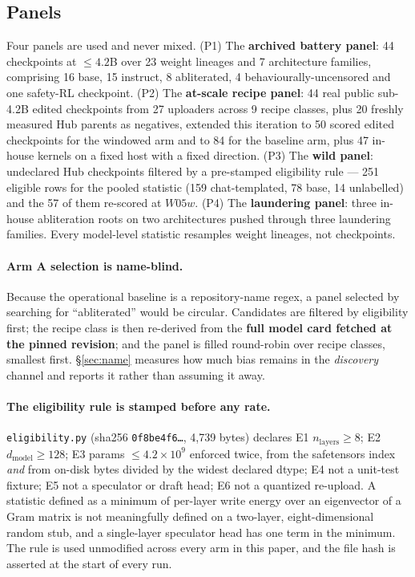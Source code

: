 \documentclass[11pt,letterpaper]{article}
\begin{document}
\subsection{Panels}

Four panels are used and never mixed. (P1) The \textbf{archived battery panel}: 44 checkpoints at $\leq 4.2$B over 23 weight lineages and 7 architecture families, comprising 16 base, 15 instruct, 8 abliterated, 4 behaviourally-uncensored and one safety-RL checkpoint. (P2) The \textbf{at-scale recipe panel}: 44 real public sub-4.2B edited checkpoints from 27 uploaders across 9 recipe classes, plus 20 freshly measured Hub parents as negatives, extended this iteration to 50 scored edited checkpoints for the windowed arm and to 84 for the baseline arm, plus 47 in-house kernels on a fixed host with a fixed direction. (P3) The \textbf{wild panel}: undeclared Hub checkpoints filtered by a pre-stamped eligibility rule --- 251 eligible rows for the pooled statistic (159 chat-templated, 78 base, 14 unlabelled) and the 57 of them re-scored at $W05w$. (P4) The \textbf{laundering panel}: three in-house abliteration roots on two architectures pushed through three laundering families. Every model-level statistic resamples weight lineages, not checkpoints.

\paragraph{Arm A selection is name-blind.} Because the operational baseline is a repository-name regex, a panel selected by searching for ``abliterated'' would be circular. Candidates are filtered by eligibility first; the recipe class is then re-derived from the \textbf{full model card fetched at the pinned revision}; and the panel is filled round-robin over recipe classes, smallest first. \S\ref{sec:name} measures how much bias remains in the \emph{discovery} channel and reports it rather than assuming it away.

\paragraph{The eligibility rule is stamped before any rate.} \texttt{eligibility.py} (sha256 \texttt{0f8be4f6\ldots}, 4,739 bytes) declares E1 $n_{\text{layers}}\geq 8$; E2 $d_{\text{model}}\geq 128$; E3 params $\leq 4.2\times10^9$ enforced twice, from the safetensors index \emph{and} from on-disk bytes divided by the widest declared dtype; E4 not a unit-test fixture; E5 not a speculator or draft head; E6 not a quantized re-upload. A statistic defined as a minimum of per-layer write energy over an eigenvector of a Gram matrix is not meaningfully defined on a two-layer, eight-dimensional random stub, and a single-layer speculator head has one term in the minimum. The rule is used unmodified across every arm in this paper, and the file hash is asserted at the start of every run.
\end{document}
